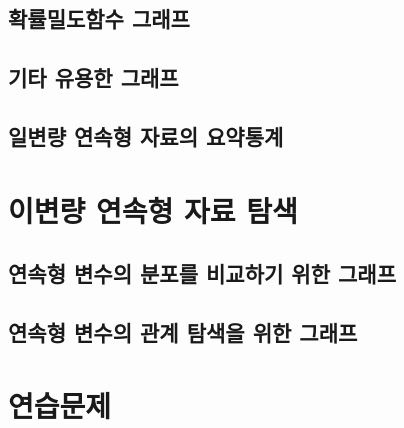 \documentclass[
]{book}
\begin{document}
\hypertarget{section-prob-density}{%
\subsection{확률밀도함수 그래프}\label{section-prob-density}}

\hypertarget{uxae30uxd0c0-uxc720uxc6a9uxd55c-uxadf8uxb798uxd504}{%
\subsection{기타 유용한 그래프}\label{uxae30uxd0c0-uxc720uxc6a9uxd55c-uxadf8uxb798uxd504}}

\hypertarget{uxc77cuxbcc0uxb7c9-uxc5f0uxc18duxd615-uxc790uxb8ccuxc758-uxc694uxc57duxd1b5uxacc4}{%
\subsection{일변량 연속형 자료의 요약통계}\label{uxc77cuxbcc0uxb7c9-uxc5f0uxc18duxd615-uxc790uxb8ccuxc758-uxc694uxc57duxd1b5uxacc4}}

\hypertarget{uxc774uxbcc0uxb7c9-uxc5f0uxc18duxd615-uxc790uxb8cc-uxd0d0uxc0c9}{%
\section{이변량 연속형 자료 탐색}\label{uxc774uxbcc0uxb7c9-uxc5f0uxc18duxd615-uxc790uxb8cc-uxd0d0uxc0c9}}

\hypertarget{uxc5f0uxc18duxd615-uxbcc0uxc218uxc758-uxbd84uxd3ecuxb97c-uxbe44uxad50uxd558uxae30-uxc704uxd55c-uxadf8uxb798uxd504}{%
\subsection{연속형 변수의 분포를 비교하기 위한 그래프}\label{uxc5f0uxc18duxd615-uxbcc0uxc218uxc758-uxbd84uxd3ecuxb97c-uxbe44uxad50uxd558uxae30-uxc704uxd55c-uxadf8uxb798uxd504}}

\hypertarget{uxc5f0uxc18duxd615-uxbcc0uxc218uxc758-uxad00uxacc4-uxd0d0uxc0c9uxc744-uxc704uxd55c-uxadf8uxb798uxd504}{%
\subsection{연속형 변수의 관계 탐색을 위한 그래프}\label{uxc5f0uxc18duxd615-uxbcc0uxc218uxc758-uxad00uxacc4-uxd0d0uxc0c9uxc744-uxc704uxd55c-uxadf8uxb798uxd504}}

\hypertarget{uxc5f0uxc2b5uxbb38uxc81c-5}{%
\section{연습문제}\label{uxc5f0uxc2b5uxbb38uxc81c-5}}

  
\end{document}
